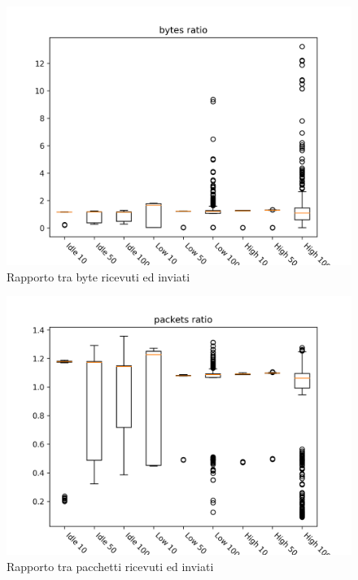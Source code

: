 \documentclass[target=bach]{thud}
\begin{document}
\begin{figure}[H]
    \includegraphics[width=\linewidth, height=0.4\textheight, keepaspectratio]{graphs/bytes ratio.png}
    \caption{Rapporto tra byte ricevuti ed inviati}
    \label{fig:br}
\end{figure}

\begin{figure}[H]
    \includegraphics[width=\linewidth, height=0.4\textheight, keepaspectratio]{graphs/packets ratio.png}
    \caption{Rapporto tra pacchetti ricevuti ed inviati}
    \label{fig:pr}
\end{figure}
\end{document}
